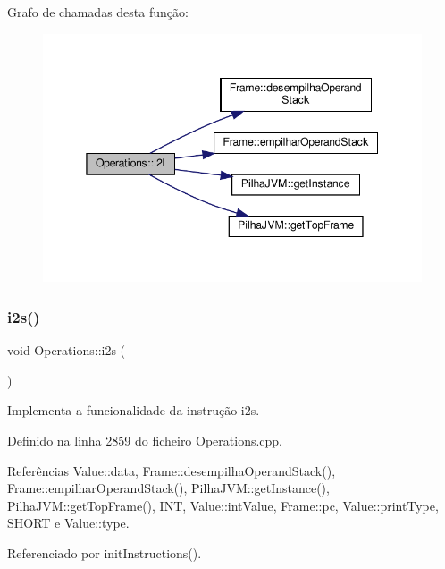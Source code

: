 Grafo de chamadas desta função\+:
\nopagebreak
\begin{figure}[H]
\begin{center}
\leavevmode
\includegraphics[width=345pt]{classOperations_ae5d28665a74411cbb880e3007c5405e8_cgraph}
\end{center}
\end{figure}
\mbox{\label{classOperations_ab83ebb06495a6e42c5edeec05e312f8c}} 
\subsubsection{\texorpdfstring{i2s()}{i2s()}}
{\footnotesize\ttfamily void Operations\+::i2s (\begin{DoxyParamCaption}{ }\end{DoxyParamCaption})\hspace{0.3cm}{\ttfamily [private]}}



Implementa a funcionalidade da instrução i2s. 



Definido na linha 2859 do ficheiro Operations.\+cpp.



Referências Value\+::data, Frame\+::desempilha\+Operand\+Stack(), Frame\+::empilhar\+Operand\+Stack(), Pilha\+J\+V\+M\+::get\+Instance(), Pilha\+J\+V\+M\+::get\+Top\+Frame(), I\+NT, Value\+::int\+Value, Frame\+::pc, Value\+::print\+Type, S\+H\+O\+RT e Value\+::type.



Referenciado por init\+Instructions().

